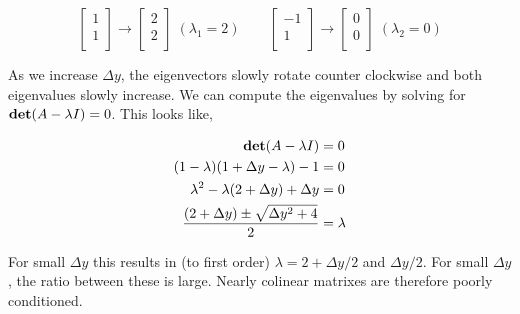 \documentclass{article}
\newcommand{\takeaway}[1]{{\color{red} #1}}
\begin{document}
\begin{equation}
    \begin{bmatrix}
        1 \\
        1 \\
    \end{bmatrix} \rightarrow
    \begin{bmatrix}
        2 \\
        2 \\
    \end{bmatrix} \; (\lambda_1 = 2) \qquad
    \begin{bmatrix}
        -1 \\
        1  \\
    \end{bmatrix} \rightarrow
    \begin{bmatrix}
        0 \\
        0 \\
    \end{bmatrix} \; (\lambda_2 = 0)
\end{equation}

As we increase $\Delta y$, the eigenvectors slowly rotate counter clockwise and both eigenvalues slowly increase. We can compute the eigenvalues by solving for ${\rm \bf det} (A - \lambda I) = 0$. This looks like,

\begin{align}
    {\rm \bf det} (A - \lambda I)                      & = 0       \\
    (1 - \lambda) (1 + \Delta y - \lambda) - 1         & = 0       \\
    \lambda^2 - \lambda(2 + \Delta y)+ \Delta y        & = 0       \\
    \frac{(2 + \Delta y) \pm \sqrt{\Delta y^2 + 4}}{2} & = \lambda
\end{align}

\noindent
For small $\Delta y$ this results in (to first order) $\lambda = 2 + \Delta y/2$ and $\Delta y/2$. For small $\Delta y$, the ratio between these is large. \takeaway{Nearly colinear matrixes are therefore poorly conditioned.}




\end{document}
